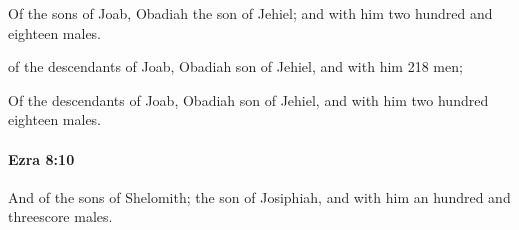 			\begin{versebox}
					\item[BHS] 
					\item[LXX] 
					\item[ASV] Of the sons of Joab, Obadiah the son of Jehiel; and with him two hundred and eighteen males.
					\item[NIV] of the descendants of Joab, Obadiah son of Jehiel, and with him 218 men;
					\item[NRSV] Of the descendants of Joab, Obadiah son of Jehiel, and with him two hundred eighteen males.
			\end{versebox}

		\paragraph{Ezra 8:10} %
			\label{EZRA-8-10}

			And of the sons of Shelomith; the son of Josiphiah, and with him an hundred and threescore males.

